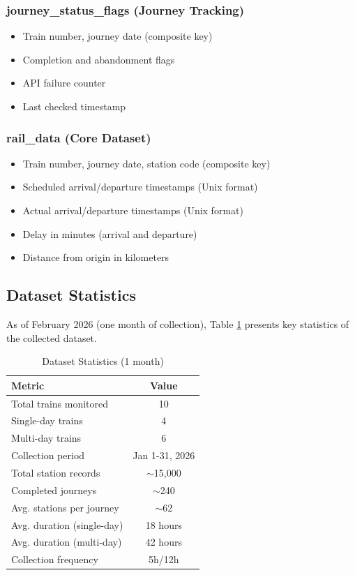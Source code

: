 \documentclass[conference]{IEEEtran}
\begin{document}
\subsubsection{journey\_status\_flags (Journey Tracking)}
\begin{itemize}
    \item Train number, journey date (composite key)
    \item Completion and abandonment flags
    \item API failure counter
    \item Last checked timestamp
\end{itemize}

\subsubsection{rail\_data (Core Dataset)}
\begin{itemize}
    \item Train number, journey date, station code (composite key)
    \item Scheduled arrival/departure timestamps (Unix format)
    \item Actual arrival/departure timestamps (Unix format)
    \item Delay in minutes (arrival and departure)
    \item Distance from origin in kilometers
\end{itemize}

\subsection{Dataset Statistics}

As of February 2026 (one month of collection), Table \ref{tab:dataset_stats} presents key statistics of the collected dataset.

\begin{table}[h]
\centering
\caption{Dataset Statistics (1 month)}
\label{tab:dataset_stats}
\begin{tabular}{@{}lc@{}}
\toprule
\textbf{Metric} & \textbf{Value} \\
\midrule
Total trains monitored & 10 \\
Single-day trains & 4 \\
Multi-day trains & 6 \\
Collection period & Jan 1-31, 2026 \\
Total station records & $\sim$15,000 \\
Completed journeys & $\sim$240 \\
Avg. stations per journey & $\sim$62 \\
Avg. duration (single-day) & 18 hours \\
Avg. duration (multi-day) & 42 hours \\
Collection frequency & 5h/12h \\
\bottomrule
\end{tabular}
\end{table}
\end{document}

